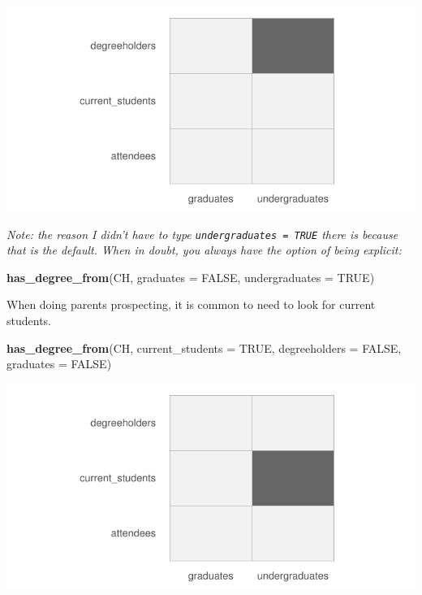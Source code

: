 \documentclass[]{book}
\newenvironment{Shaded}{\begin{snugshade}}{\end{snugshade}}
\newcommand{\DataTypeTok}[1]{\textcolor[rgb]{0.13,0.29,0.53}{#1}}
\newcommand{\KeywordTok}[1]{\textcolor[rgb]{0.13,0.29,0.53}{\textbf{#1}}}
\newcommand{\NormalTok}[1]{#1}
\newcommand{\OtherTok}[1]{\textcolor[rgb]{0.56,0.35,0.01}{#1}}
\begin{document}
\includegraphics{images/unnamed-chunk-31-1.pdf}

\emph{Note: the reason I didn't have to type \texttt{undergraduates\ =\ TRUE} there is because that is the default. When in doubt, you always have the option of being explicit:}

\begin{Shaded}
\begin{Highlighting}[]
\KeywordTok{has_degree_from}\NormalTok{(CH, }\DataTypeTok{graduates =} \OtherTok{FALSE}\NormalTok{, }\DataTypeTok{undergraduates =} \OtherTok{TRUE}\NormalTok{)}
\end{Highlighting}
\end{Shaded}

When doing parents prospecting, it is common to need to look for current students.

\begin{Shaded}
\begin{Highlighting}[]
\KeywordTok{has_degree_from}\NormalTok{(CH, }
                \DataTypeTok{current_students =} \OtherTok{TRUE}\NormalTok{, }\DataTypeTok{degreeholders =} \OtherTok{FALSE}\NormalTok{, }
                \DataTypeTok{graduates =} \OtherTok{FALSE}\NormalTok{)}
\end{Highlighting}
\end{Shaded}

\includegraphics{images/unnamed-chunk-34-1.pdf}
\end{document}
